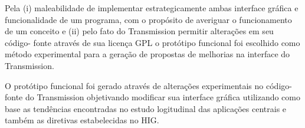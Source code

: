 Pela (i) maleabilidade de implementar estrategicamente ambas interface gráfica e
funcionalidade de um programa, com o propósito de averiguar o funcionamento de
um conceito e (ii) pelo fato do Transmission permitir alterações em seu código-
fonte através de sua licença GPL o protótipo funcional foi escolhido como método
experimental para a geração de propostas de melhorias na interface do
Transmission.

O protótipo funcional foi gerado através de alterações experimentais no código-
fonte do Transmission objetivando modificar sua interface gráfica utilizando
como base as tendências encontradas no estudo logitudinal das aplicações
centrais e também as diretivas estabelecidas no HIG.
